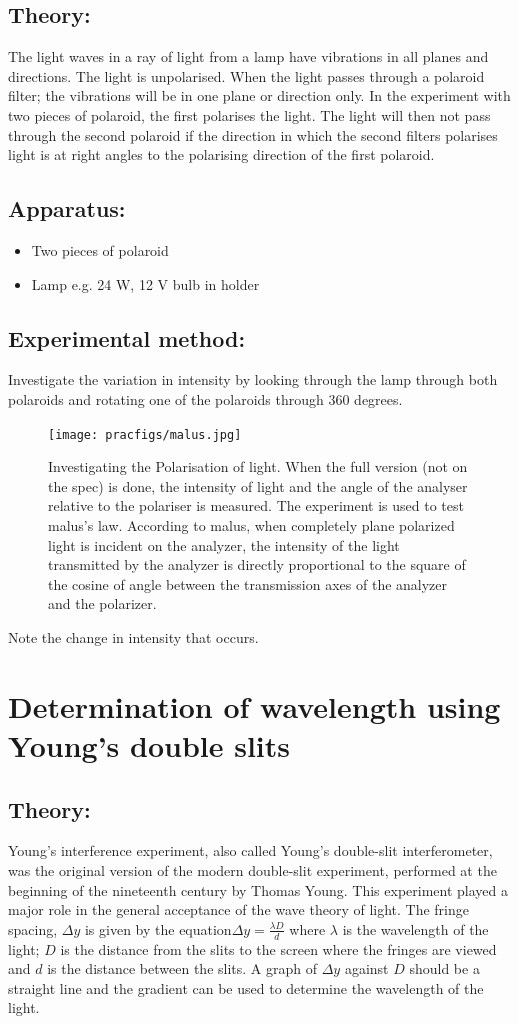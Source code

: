 \subsection{Theory:} 
The light waves in a ray of light from a lamp have vibrations in all planes and directions.  The light is unpolarised.  When the light passes through a polaroid filter; the vibrations will be in one plane or direction only.  In the experiment with two pieces of polaroid, the first polarises the light.  The light will then not pass through the second polaroid if the direction in which the second filters polarises light is at right angles to the polarising direction of the first polaroid.
\subsection{Apparatus:} \begin{itemize} 
\item Two pieces of polaroid 
\item Lamp e.g. 24 W, 12 V bulb in holder  
\end{itemize}
\subsection{Experimental method:} 
Investigate the variation in intensity by looking through the lamp through both polaroids and rotating one of the polaroids through 360 degrees.
\begin{figure}
\texttt{[image: pracfigs/malus.jpg]}
\caption{Investigating the Polarisation of light. When the full version (not on the spec) is done, the intensity of light and the angle of the analyser relative to the polariser is measured. The experiment is used to test malus's law. According to malus, when completely plane polarized light is incident on the analyzer, the intensity of the light transmitted by the analyzer is directly proportional to the square of the cosine of angle between the transmission axes of the analyzer and the polarizer.}
\end{figure} 
Note the change in intensity that occurs. 
\section{Determination of wavelength using Young's double slits}
\subsection{Theory:} Young's interference experiment, also called Young's double-slit interferometer, was the original version of the modern double-slit experiment, performed at the beginning of the nineteenth century by Thomas Young. This experiment played a major role in the general acceptance of the wave theory of light. The fringe spacing, $\Delta y $ is given by the equation$\Delta y = \frac{\lambda D}{d}$ where $\lambda$ is the wavelength of the light; $D$ is the distance from the slits to the screen where the fringes are viewed and $d$ is the distance between the slits.  A graph of $\Delta y$ against $D$ should be a straight line and the gradient can be used to determine the wavelength of the light. 
